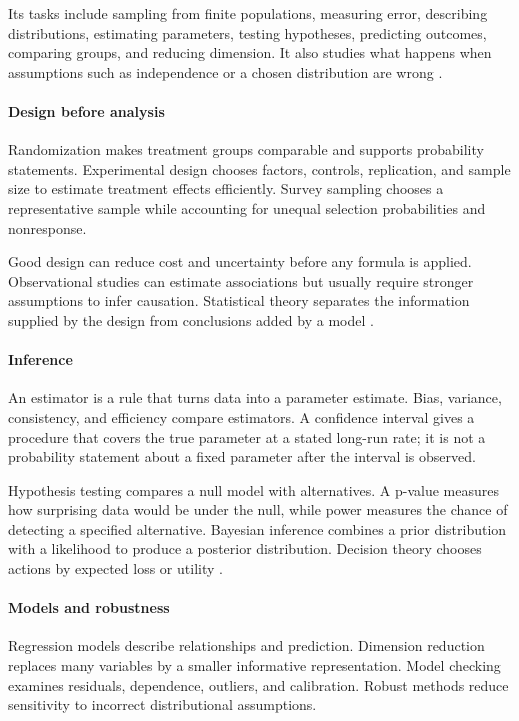 Its tasks include sampling from finite populations, measuring error, describing distributions, estimating parameters, testing hypotheses, predicting outcomes, comparing groups, and reducing dimension. It also studies what happens when assumptions such as independence or a chosen distribution are wrong \cite{statistics_ref2}.

\paragraph{Design before analysis}
Randomization makes treatment groups comparable and supports probability statements. Experimental design chooses factors, controls, replication, and sample size to estimate treatment effects efficiently. Survey sampling chooses a representative sample while accounting for unequal selection probabilities and nonresponse.

Good design can reduce cost and uncertainty before any formula is applied. Observational studies can estimate associations but usually require stronger assumptions to infer causation. Statistical theory separates the information supplied by the design from conclusions added by a model \cite{statistics_ref3}.

\paragraph{Inference}
An estimator is a rule that turns data into a parameter estimate. Bias, variance, consistency, and efficiency compare estimators. A confidence interval gives a procedure that covers the true parameter at a stated long-run rate; it is not a probability statement about a fixed parameter after the interval is observed.

Hypothesis testing compares a null model with alternatives. A p-value measures how surprising data would be under the null, while power measures the chance of detecting a specified alternative. Bayesian inference combines a prior distribution with a likelihood to produce a posterior distribution. Decision theory chooses actions by expected loss or utility \cite{statistics_ref4}.

\paragraph{Models and robustness}
Regression models describe relationships and prediction. Dimension reduction replaces many variables by a smaller informative representation. Model checking examines residuals, dependence, outliers, and calibration. Robust methods reduce sensitivity to incorrect distributional assumptions.

